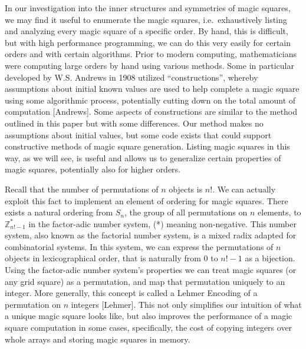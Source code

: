 \documentclass{rhumj_new}
\begin{document}
In our investigation into the inner structures and symmetries of magic squares, we may find it
useful to enumerate the magic squares, i.e.\ exhaustively listing and analyzing every magic square
of a specific order. By hand, this is difficult, but with high performance programming, we can do
this very easily for certain orders and with certain algorithms. Prior to modern computing,
mathematicians were computing large orders by hand using various methods. Some in particular
developed by W.S. Andrews in 1908 utilized ``constructions'', whereby assumptions about initial
known values are used to help complete a magic square using some algorithmic process, potentially
cutting down on the total amount of computation [Andrews]. Some aspects of constructions are
similar to the method outlined in this paper but with some differences. Our method makes no
assumptions about initial values, but some code exists that could support constructive methods of
magic square generation. Listing magic squares in this way, as we will see, is useful and allows us
to generalize certain properties of magic squares, potentially also for higher orders.

Recall that the number of permutations of $n$ objects is $n$!. We can actually exploit this
fact to implement an element of ordering for magic squares. There exists a natural ordering from
$S_n$, the group of all permutations on $n$ elements, to $\mathbb{Z}^{*}_{n!-1}$  in the
factor-adic number system, (*) meaning non-negative. This number system, also known as the
factorial number system, is a mixed radix adapted for combinatorial systems. In this system, we can
express the permutations of $n$ objects in lexicographical order, that is naturally from $0$ to
$n!-1$ as a bijection. Using the factor-adic number system's properties we can treat magic squares
(or any grid square) as a permutation, and map that permutation uniquely to an integer. More
generally, this concept is called a Lehmer Encoding of a permutation on $n$ integers [Lehmer]. This
not only simplifies our intuition of what a unique magic square looks like, but also improves the
performance of a magic square computation in some cases, specifically, the cost of copying integers
over whole arrays and storing magic squares in memory.
\end{document}
